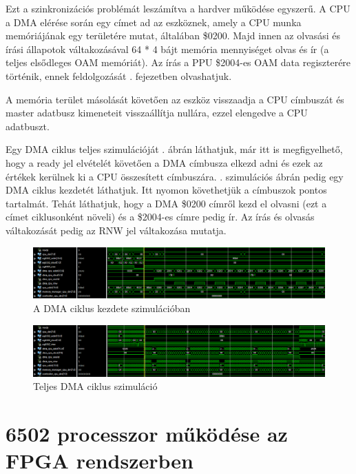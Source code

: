 Ezt a szinkronizációs problémát leszámítva a hardver működése egyszerű. A CPU a DMA elérése során egy címet ad az eszköznek, amely a CPU munka memóriájának egy területére mutat, általában \$0200. Majd innen az olvasási és írási állapotok váltakozásával 64 * 4 bájt memória mennyiséget olvas és ír (a teljes elsődleges OAM memóriát). Az írás a PPU \$2004-es OAM data regiszterére történik, ennek feldolgozását . fejezetben olvashatjuk.

A memória terület másolását követően az eszköz visszaadja a CPU címbuszát és master adatbusz kimeneteit visszaállítja nullára, ezzel elengedve a CPU adatbuszt. %

Egy DMA ciklus teljes szimulációját . ábrán láthatjuk, már itt is megfigyelhető, hogy a ready jel elvételét követően a DMA címbusza elkezd adni és ezek az értékek kerülnek ki a CPU összesített címbuszára. . szimulációs ábrán pedig egy DMA ciklus kezdetét láthatjuk. Itt nyomon követhetjük a címbuszok pontos tartalmát. Tehát láthatjuk, hogy a DMA \$0200 címről kezd el olvasni (ezt a címet ciklusonként növeli) és a \$2004-es címre pedig ír. Az írás és olvasás váltakozását pedig az RNW jel váltakozása mutatja. 

\begin{figure}[H]
	\centering
	\includegraphics[width=150mm, keepaspectratio]{figures/Working-dma-in-simulation}
	\caption{A DMA ciklus kezdete szimulációban} 
	\label{fig:Working-dma-in-simulation}
\end{figure} 

\begin{figure}[H]
	\centering
	\includegraphics[width=150mm, keepaspectratio]{figures/Full-dma-working-in-simulation}
	\caption{Teljes DMA ciklus szimuláció} 
	\label{fig:Full-dma-working-in-simulation}
\end{figure} 

\section{6502 processzor működése az FPGA rendszerben}

